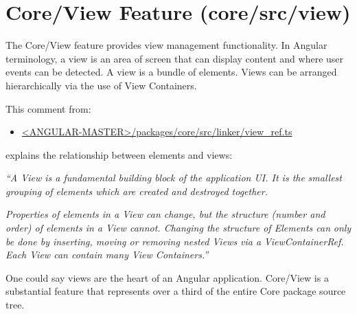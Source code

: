 \section{Core/View Feature (core/src/view)}

The Core/View feature provides view management functionality. In Angular
terminology, a view is an area of screen that can display content and where user
events can be detected. A view is a bundle of elements. Views can be arranged
hierarchically via the use of View Containers.

This comment from:

\begin{itemize}
  \item \href{https://github.com/angular/angular/blob/master/packages/core/src/linker/view_ref.ts}
        {<ANGULAR-MASTER>/packages/core/src/linker/view\_ref.ts}
\end{itemize}

explains the relationship between elements and views:

\emph{“A View is a fundamental building block of the application UI. It is the}
\emph{smallest grouping of elements which are created and destroyed together.}

\emph{Properties of elements in a View can change, but the structure (number and}
\emph{order) of elements in a View cannot. Changing the structure of Elements can}
\emph{only be done by inserting, moving or removing nested Views via a}
\emph{ViewContainerRef. Each View can contain many View Containers.”}

One could say views are the heart of an Angular application. Core/View is a
substantial feature that represents over a third of the entire Core package source
tree.






